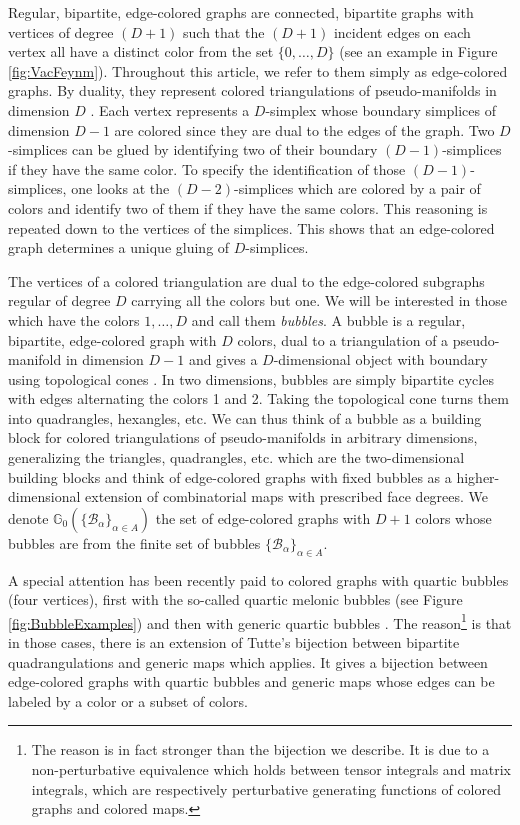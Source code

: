 \documentclass[aps,prd,10pt,notitlepage,nofootinbib,superscriptaddress,showkeys,showpacs]{revtex4-1}
\begin{document}
Regular, bipartite, edge-colored graphs are connected, bipartite graphs with vertices of degree $(D+1)$ such that the $(D+1)$ incident edges on each vertex all have a distinct color from the set $\{0, \dotsc, D\}$ (see an example in Figure \ref{fig:VacFeynm}). Throughout this article, we refer to them simply as edge-colored graphs. By duality, they represent colored triangulations of pseudo-manifolds in dimension $D$ \cite{ColoredReview}. Each vertex represents a $D$-simplex whose boundary simplices of dimension $D-1$ are colored since they are dual to the edges of the graph. Two $D$-simplices can be glued by identifying two of their boundary $(D-1)$-simplices if they have the same color. To specify the identification of those $(D-1)$-simplices, one looks at the $(D-2)$-simplices which are colored by a pair of colors and identify two of them if they have the same colors. This reasoning is repeated down to the vertices of the simplices. This shows that an edge-colored graph determines a unique gluing of $D$-simplices.

The vertices of a colored triangulation are dual to the edge-colored subgraphs regular of degree $D$ carrying all the colors but one. We will be interested in those which have the colors $1, \dotsc, D$ and call them \emph{bubbles}. A bubble is a regular, bipartite, edge-colored graph with $D$ colors, dual to a triangulation of a pseudo-manifold in dimension $D-1$ and gives a $D$-dimensional object with boundary using topological cones \cite{Uncolored}. In two dimensions, bubbles are simply bipartite cycles with edges alternating the colors 1 and 2. Taking the topological cone turns them into quadrangles, hexangles, etc. We can thus think of a bubble as a building block for colored triangulations of pseudo-manifolds in arbitrary dimensions, generalizing the triangles, quadrangles, etc. which are the two-dimensional building blocks and think of edge-colored graphs with fixed bubbles as a higher-dimensional extension of combinatorial maps with prescribed face degrees. We denote ${\mathbb{G}}_0(\{{\mathcal{B}}_\alpha\}_{\alpha\in A})$ the set of edge-colored graphs with $D+1$ colors whose bubbles are from the finite set of bubbles $\{{\mathcal{B}}_\alpha\}_{\alpha\in A}$.

A special attention has been recently paid to colored graphs with quartic bubbles (four vertices), first with the so-called quartic melonic bubbles \cite{BeyondPert} (see Figure \ref{fig:BubbleExamples}) and then with generic quartic bubbles \cite{ArbitraryQuartic}. The reason\footnote{The reason is in fact stronger than the bijection we describe. It is due to a non-perturbative equivalence which holds between tensor integrals and matrix integrals, which are respectively perturbative generating functions of colored graphs and colored maps.} is that in those cases, there is an extension of Tutte's bijection between bipartite quadrangulations and generic maps which applies. It gives a bijection between edge-colored graphs with quartic bubbles and generic maps whose edges can be labeled by a color or a subset of colors.
\end{document}
